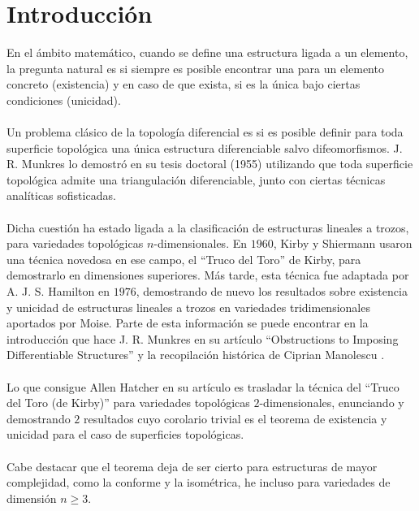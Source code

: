 %


\chapter{Introducción}

En el ámbito matemático, cuando se define una estructura ligada a un elemento, la pregunta natural es si siempre es posible encontrar una para un elemento concreto (existencia) y en caso de que exista, si es la única bajo ciertas condiciones (unicidad).\\
\\Un problema clásico de la topología diferencial es si es posible definir para toda superficie topológica una única estructura diferenciable salvo difeomorfismos. J. R. Munkres lo demostró en su tesis doctoral (1955) utilizando que toda superficie topológica admite una triangulación diferenciable, junto con ciertas técnicas analíticas sofisticadas.\\
\\Dicha cuestión ha estado ligada a la clasificación de estructuras lineales a trozos, para variedades topológicas $n$-dimensionales. En $1960$, Kirby y Shiermann usaron una técnica novedosa en ese campo, el ``Truco del Toro'' de Kirby, para demostrarlo en dimensiones superiores. Más tarde, esta técnica fue adaptada por A. J. S. Hamilton en $1976$, demostrando de nuevo los resultados sobre existencia y unicidad de estructuras lineales a trozos en variedades tridimensionales aportados por Moise. Parte de esta información se puede encontrar en la introducción que hace J. R. Munkres en su artículo ``Obstructions to Imposing Differentiable Structures'' \cite{Munkres} y la recopilación histórica de Ciprian Manolescu \cite{Historical}.\\
\\Lo que consigue Allen Hatcher en su artículo \cite{arXiv:1312.3518} es trasladar la técnica del ``Truco del Toro (de Kirby)'' para variedades topológicas $2$-dimensionales, enunciando y demostrando $2$ resultados cuyo corolario trivial es el teorema de existencia y unicidad para el caso de superficies topológicas.\\
\\Cabe destacar que el teorema deja de ser cierto para estructuras de mayor complejidad, como la conforme y la isométrica, he incluso para variedades de dimensión $n \geq 3$.\\
